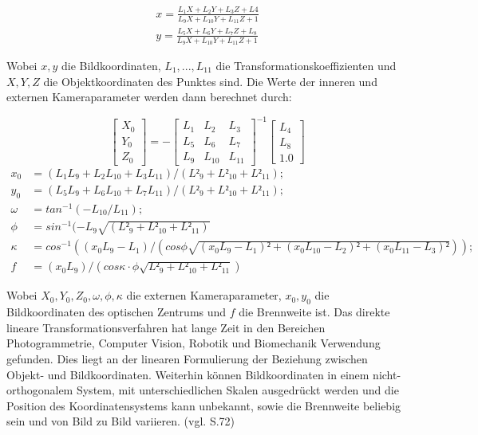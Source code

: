 \begin{equation}
\begin{aligned}
x=\frac{L_1X+L_2Y+L_3Z+L4}{L_9X+L_{10}Y+L_{11}Z+1} \\
y=\frac{L_5X+L_6Y+L_7Z+L_8}{L_9X+L_{10}Y+L_{11}Z+1}
\end{aligned}
\end{equation}

Wobei $x,y$ die Bildkoordinaten, $L_1,...,L_{11}$ die Transformationskoeffizienten und $X,Y,Z$ die Objektkoordinaten des Punktes sind. Die Werte der inneren und externen Kameraparameter werden dann berechnet durch:

\begin{equation}
\begin{bmatrix}
X_0 \\ Y_0 \\ Z_0 
\end{bmatrix}
 = -
 \begin{bmatrix}
 L_1 & L_2 & L_3 \\
 L_5 & L_6 & L_7 \\
 L_9 & L_{10} & L_{11}
 \end{bmatrix}^{-1}
 \begin{bmatrix}
 L_4 \\ L_8 \\ 1.0
 \end{bmatrix}
 \end{equation}
 \begin{equation}
 \begin{aligned}
 x_0 &= (L_1L_9 + L_2L_{10} + L_3L_{11})/(L²_9 + L²_{10} + L²_{11}); \\
 y_0 &= (L_5L_9 + L_6L_{10} + L_7L_{11})/(L²_9 + L²_{10} + L²_{11}); \\
 \omega &= tan^{-1}(-L_{10}/L_{11}); \\
 \phi &= sin^{-1}(-L_9 \sqrt{(L²_9 + L²_{10} + L²_{11})} \\
  \kappa &= cos^{-1}((x_0L_9 - L_1)/(cos \phi \sqrt{(x_0L_9-L_1)² + (x_0L_{10}-L_2)² + (x_0L_{11}-L_3)²})); \\
 f&=(x_0L_9)/(cos \kappa \cdot \phi \sqrt{L²_9 + L²_{10} + L²_{11}}) 
 \end{aligned}
 \end{equation}

Wobei $X_0,Y_0,Z_0,\omega ,\phi , \kappa $ die externen Kameraparameter, $x_0,y_0$ die Bildkoordinaten des optischen Zentrums und $f$ die Brennweite ist. Das direkte lineare Transformationsverfahren hat lange Zeit in den Bereichen Photogrammetrie, Computer Vision, Robotik und Biomechanik Verwendung gefunden. Dies liegt an der linearen Formulierung der Beziehung zwischen Objekt- und Bildkoordinaten. Weiterhin können Bildkoordinaten in einem nicht-orthogonalem System, mit unterschiedlichen Skalen ausgedrückt werden und die Position des Koordinatensystems kann unbekannt, sowie die Brennweite beliebig sein und von Bild zu Bild variieren. (vgl. \cite{dlt} S.72)

